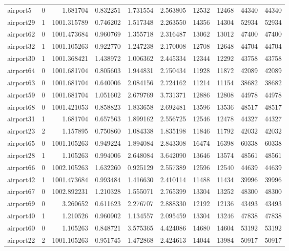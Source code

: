 \begin{longtable}{|l|r|r|r|r|r|r|r|r|r|}
airport5 & 0 & 1.681704 & 0.832251 & 1.731554 & 2.563805 & 12532 & 12468 & 44340 & 44340 \\
airport29 & 1 & 1001.315789 & 0.746202 & 1.517348 & 2.263550 & 14356 & 14304 & 52934 & 52934 \\
airport62 & 0 & 1001.473684 & 0.960769 & 1.355718 & 2.316487 & 13062 & 13012 & 47400 & 47400 \\
airport32 & 1 & 1001.105263 & 0.922770 & 1.247238 & 2.170008 & 12708 & 12648 & 44704 & 44704 \\
airport30 & 1 & 1001.368421 & 1.438972 & 1.006362 & 2.445334 & 12344 & 12292 & 43758 & 43758 \\
airport64 & 0 & 1001.681704 & 0.805603 & 1.944831 & 2.750434 & 11928 & 11872 & 42089 & 42089 \\
airport63 & 0 & 1001.681704 & 0.640006 & 2.084156 & 2.724162 & 11214 & 11154 & 38682 & 38682 \\
airport59 & 0 & 1001.681704 & 1.051602 & 2.679769 & 3.731371 & 12886 & 12808 & 44978 & 44978 \\
airport68 & 0 & 1001.421053 & 0.858823 & 1.833658 & 2.692481 & 13596 & 13536 & 48517 & 48517 \\
airport31 & 1 & 1.681704 & 0.657563 & 1.899162 & 2.556725 & 12546 & 12478 & 44327 & 44327 \\
airport23 & 2 & 1.157895 & 0.750860 & 1.084338 & 1.835198 & 11846 & 11792 & 42032 & 42032 \\
airport65 & 0 & 1001.105263 & 0.949224 & 1.894084 & 2.843308 & 16474 & 16398 & 60338 & 60338 \\
airport28 & 1 & 1.105263 & 0.994006 & 2.648084 & 3.642090 & 13646 & 13574 & 48561 & 48561 \\
airport66 & 0 & 1002.105263 & 1.632260 & 0.925129 & 2.557389 & 12596 & 12540 & 44639 & 44639 \\
airport42 & 1 & 1001.473684 & 0.993484 & 1.416630 & 2.410114 & 11488 & 11434 & 39996 & 39996 \\
airport67 & 0 & 1002.892231 & 1.210328 & 1.555071 & 2.765399 & 13304 & 13252 & 48300 & 48300 \\
airport69 & 0 & 3.260652 & 0.611623 & 2.276707 & 2.888330 & 12192 & 12136 & 43493 & 43493 \\
airport40 & 1 & 1.210526 & 0.960902 & 1.134557 & 2.095459 & 13304 & 13246 & 47838 & 47838 \\
airport60 & 0 & 1.105263 & 0.848721 & 3.575365 & 4.424086 & 14680 & 14604 & 53192 & 53192 \\
airport22 & 2 & 1001.105263 & 0.951745 & 1.472868 & 2.424613 & 14044 & 13984 & 50917 & 50917 \\

\end{longtable}
